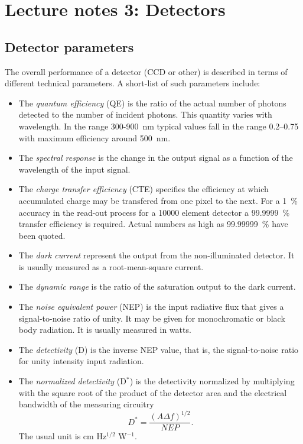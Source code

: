 \documentclass{article}
\begin{document}
\section*{Lecture notes 3: Detectors}

\subsection*{Detector parameters}

The overall performance of a detector (CCD or other) is described in terms of
different technical parameters. A short-list of such parameters
include:

\begin{itemize}
  \item The {\em quantum efficiency} (QE) is the ratio of the actual
  number of photons detected to the number of incident photons. This
  quantity varies with wavelength. In the range 300-900~nm typical
  values fall in the range 0.2--0.75 with maximum efficiency around 
  500~nm.  
  \item The {\em spectral response} is the change in the output
  signal as a function of the wavelength of the input signal.
  \item The {\em charge transfer efficiency} (CTE) specifies the 
  efficiency at which accumulated charge may be transfered from one 
  pixel to the next. For a 1~\% accuracy in the read-out process 
  for a 10000 element detector a 99.9999~\% transfer efficiency is
  required. Actual numbers as high as 99.99999~\% have been quoted.
  \item The {\em dark current} represent the output from the
  non-illuminated detector. It is usually measured as a
  root-mean-square current.  
  \item The {\em dynamic range} is the ratio of the saturation output
  to the dark current.  
  \item The {\em  noise equivalent power} (NEP) is the input radiative 
  flux that gives
  a signal-to-noise ratio of unity. It may be given for monochromatic
  or black body radiation. It is usually measured in watts.  
  \item The  {\em detectivity} (D) is the inverse NEP value, that is, the
  signal-to-noise ratio for unity intensity input radiation.  
  \item  The {\em normalized detectivity} (D$^*$) is the detectivity
  normalized by multiplying with the square root of the product of the
  detector area and the electrical bandwidth of the measuring
  circuitry 
  \begin{equation} 
    D^* = \frac{(A \Delta f)^{1/2}}{NEP}.
    \label{CCD.Dstar}
  \end{equation}
  The usual unit is cm Hz$^{1/2}$ W$^{-1}$.
\end{itemize}
\end{document}
